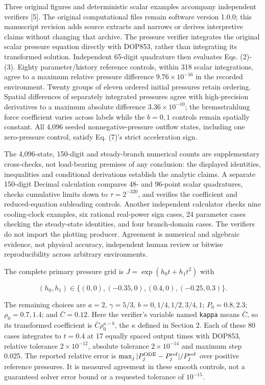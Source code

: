Three original figures and deterministic scalar examples accompany
independent verifiers {[}5{]}. The original computational files remain
software version 1.0.0; this manuscript revision adds source extracts
and narrows or derives interpretive claims without changing that
archive. The pressure verifier integrates the original scalar pressure
equation directly with DOP853, rather than integrating its transformed
solution. Independent 65-digit quadrature then evaluates Eqs. (2)-(3).
Eighty parameter/history reference controls, within 318 scalar
integrations, agree to a maximum relative pressure difference
\(9.76\times10^{-16}\) in the recorded environment. Twenty groups of
eleven ordered initial pressures retain ordering. Spatial differences of
separately integrated pressures agree with high-precision derivatives to
a maximum absolute difference \(3.36\times10^{-10}\); the bremsstrahlung
force coefficient varies across labels while the \(b=0,1\) controls
remain spatially constant. All 4,096 seeded nonnegative-pressure outflow
states, including one zero-pressure control, satisfy Eq. (7)'s strict
acceleration sign.

The 4,096-state, 150-digit and steady-branch numerical counts are
supplementary cross-checks, not load-bearing premises of any conclusion:
the displayed identities, inequalities and conditional derivations
establish the analytic claims. A separate 150-digit Decimal calculation
compares 48- and 96-point scalar quadratures, checks cumulative limits
down to \(\tau=2^{-320}\), and verifies the coefficient and
reduced-equation subleading controls. Another independent calculator
checks nine cooling-clock examples, six rational real-power sign cases,
24 parameter cases checking the steady-state identities, and four
branch-domain cases. The verifiers do not import the plotting producer.
Agreement is numerical and algebraic evidence, not physical accuracy,
independent human review or bitwise reproducibility across arbitrary
environments.

The complete primary pressure grid is \(J=\exp(h_0t+h_1t^2)\) with

\[
(h_0,h_1)\in\{(0,0),(-0.35,0),(0.4,0),(-0.25,0.3)\}.
\]

The remaining choices are \(a=2\), \(\gamma=5/3\),
\(b=0,1/4,1/2,3/4,1\); \(P_0=0.8,2.3\); \(\rho_0=0.7,1.4\); and
\(\bar C=0.12\). Here the verifier's variable named \nolinkurl{kappa} means
\(\bar C\), so its transformed coefficient is \(\bar C\rho_0^{a-b}\),
the \(\kappa\) defined in Section 2. Each of these 80 cases integrates
to \(t=0.4\) at 17 equally spaced output times with DOP853, relative
tolerance \(2\times10^{-12}\), absolute tolerance \(2\times10^{-14}\)
and maximum step 0.025. The reported relative error is
\(\max_j|P_j^{\rm ODE}-P_j^{\rm ref}|/P_j^{\rm ref}\) over positive
reference pressures. It is measured agreement in these smooth controls,
not a guaranteed solver error bound or a requested tolerance of
\(10^{-15}\).

